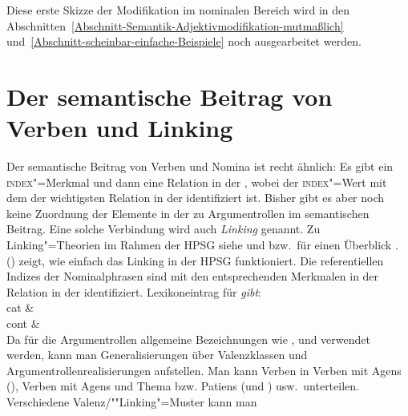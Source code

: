 Diese erste Skizze der Modifikation im nominalen Bereich wird in den 
Abschnitten~\ref{Abschnitt-Semantik-Adjektivmodifikation-mutmaßlich} und~\ref{Abschnitt-scheinbar-einfache-Beispiele}
noch ausgearbeitet werden.

\section{Der semantische Beitrag von Verben und Linking}
\label{sec-Linking}

Der semantische Beitrag von Verben und Nomina ist recht ähnlich: Es gibt ein \textsc{index}"=Merkmal
und dann eine Relation in der \relsl, wobei der \textsc{index}"=Wert mit dem \argzero der
wichtigsten Relation in der \relsl identifiziert ist. Bisher gibt es aber noch keine Zuordnung der Elemente in der \argstl{} zu
Argumentrollen im semantischen Beitrag. Eine solche Verbindung wird auch \emph{Linking} genannt.
Zu Linking"=Theorien im Rahmen der HPSG siehe  und  bzw.\ für
einen Überblick .
() zeigt, wie einfach das Linking in der HPSG funktioniert.
Die referentiellen Indizes der Nominalphrasen sind mit den entsprechenden Merkmalen in der Relation
in der \relsl identifiziert.
\eas
\label{le-gibt}%
Lexikoneintrag für \emph{gibt}:\\
\ms
{ cat &  \\
  cont &  \\
}
\zs
Da für die Argumentrollen allgemeine Bezeichnungen wie \argone, \argtwo und \argthree
verwendet werden, kann man Generalisierungen über Valenzklassen und
Argumentrollenrealisierungen aufstellen. Man kann \zb Verben in Verben mit Agens (\argone), Verben mit Agens
und Thema bzw. Patiens (\argone und \argtwo) usw.\ unterteilen. Verschiedene Valenz/""Linking"=Muster kann man
